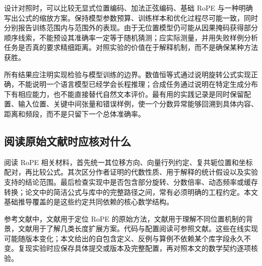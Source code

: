 \documentclass[UTF8,12pt,a4paper,fontset=fandol]{ctexart}
\begin{document}
设计对照时，可以比较无显式位置编码、加法正弦编码、基础 RoPE 与一种明确写出公式的缩放方案。保持模型参数预算、训练样本和优化过程尽可能一致，同时分别报告训练范围内与范围外的表现。由于无位置模型仍可能从因果掩码获得部分顺序线索，不能预设其准确率一定等于随机猜测；应实际测量，并用失败样例分析任务是否真的要求精细距离。对照实验的价值在于解释机制，而不是确保某种方法获胜。

所有结果应注明实现检验与模型训练的边界。数值恒等式通过说明旋转公式实现正确，不能说明一个语言模型已经学会长程推理；合成任务通过说明在特定生成分布下有相应能力，也不能直接替代自然文本评价。最有用的实践记录是同时保留配置、输入位置、关键中间张量和错误样例，使一个分数异常能够回溯到具体内容、距离和频段，而不是只留下一个总体准确率。

\subsection{阅读原始文献时应核对什么}
阅读 RoPE 相关材料，首先统一其位移方向、向量行列约定、复共轭位置和坐标配对，再比较公式。其次区分作者证明的代数性质、用于解释的统计假设以及实验支持的结论范围。最后检查实现中是否包含部分旋转、分数倍率、动态频率或缓存转换；论文中的简洁公式与库中的完整路径之间，常有必须明确的工程约定。本文基础推导覆盖的是这些约定共同依赖的核心数学结构。

参考文献中，文献\cite{su2021}用于定位 RoPE 的原始方法，文献\cite{vaswani2017,press2021}用于理解不同位置机制的背景，文献\cite{chen2023,peng2023,ding2024}用于了解几类长度扩展方案。代码与配置阅读可参照文献\cite{meta-llama,hf-rope}。这些在线实现可能随版本变化；本文给出的自包含定义、反例与算例不依赖某个库字段永久不变。复现实验时应保存具体提交或版本及完整配置，再对照本文的数学契约逐项核验。
\end{document}
